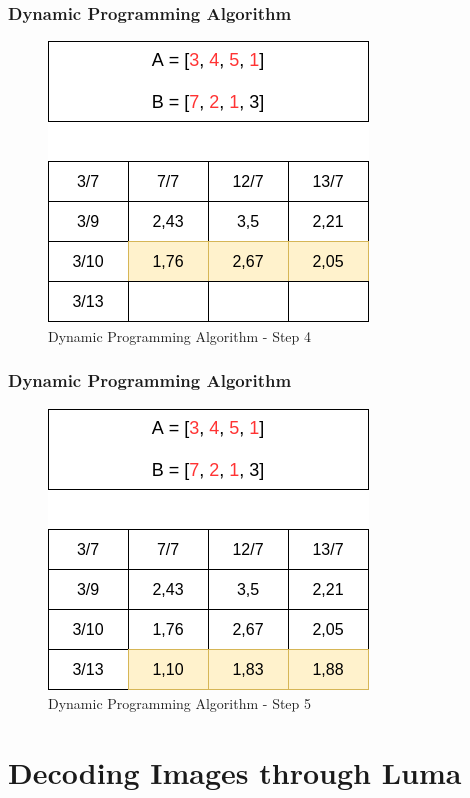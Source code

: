\documentclass{beamer}
\begin{document}
    \begin{frame}
      \frametitle{Dynamic Programming Algorithm}
      
      \begin{figure}
		\centering
		\includegraphics[scale=.48]{dp_8.png}
		\caption{Dynamic Programming Algorithm - Step 4}
		\label{fig:dynamic_programming_algorithm_8}
	  \end{figure}
      
    \end{frame}
    
    \begin{frame}
      \frametitle{Dynamic Programming Algorithm}
      
      \begin{figure}
		\centering
		\includegraphics[scale=.48]{dp_9.png}
		\caption{Dynamic Programming Algorithm - Step 5}
		\label{fig:dynamic_programming_algorithm_9}
	  \end{figure}
      
    \end{frame}
    
  \section{Decoding Images through Luma}
\end{document}

